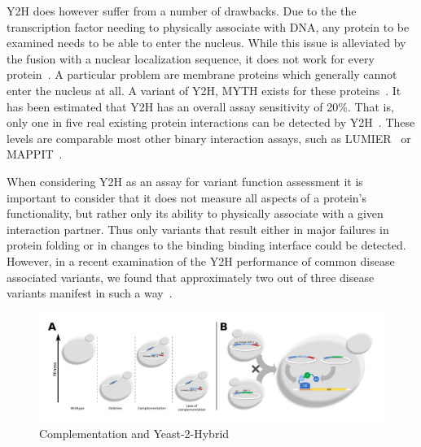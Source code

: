 Y2H does however suffer from a number of drawbacks. Due to the the transcription factor needing to physically associate with DNA, any protein to be examined needs to be able to enter the nucleus. While this issue is alleviated by the fusion with a nuclear localization sequence, it does not work for every protein~\cite{Y2Hnls}. A particular problem are membrane proteins which generally cannot enter the nucleus at all. A variant of Y2H, MYTH exists for these proteins~\cite{MYTH}. It has been estimated that Y2H has an overall assay sensitivity of 20\%. That is, only one in five real existing protein interactions can be detected by Y2H~\cite{Rual2012?}. These levels are comparable most other binary interaction assays, such as LUMIER~\cite{lumier} or MAPPIT~\cite{mappit}.


When considering Y2H as an assay for variant function assessment it is important to consider that it does not measure all aspects of a protein's functionality, but rather only its ability to physically associate with a given interaction partner. Thus only variants that result either in major failures in protein folding or in changes to the binding binding interface could be detected. However, in a recent examination of the Y2H performance of common disease associated variants, we found that approximately two out of three disease variants manifest in such a way~\cite{Sahni2015}. 


\begin{figure}[h!]
	\centering
	\includegraphics[width=\textwidth]{img/compl_y2h.pdf}
	\caption{Complementation and Yeast-2-Hybrid}
	\label{fig:compl_y2h}
\end{figure}

